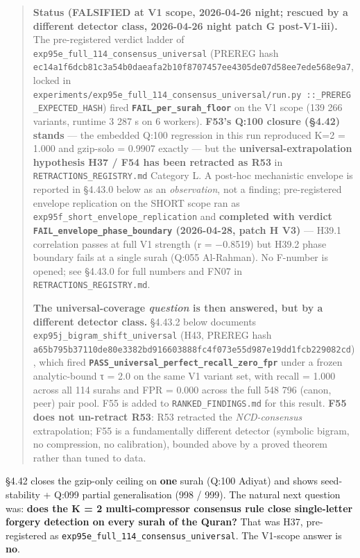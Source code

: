 \documentclass[
]{article}
\begin{document}
\begin{quote}
\textbf{Status (FALSIFIED at V1 scope, 2026-04-26 night; rescued by a
different detector class, 2026-04-26 night patch G post-V1-iii).} The
pre-registered verdict ladder of
\texttt{exp95e\_full\_114\_consensus\_universal} (PREREG hash
\texttt{ec14a1f6dcb81c3a54b0daeafa2b10f8707457ee4305de07d58ee7ede568e9a7},
locked in
\texttt{experiments/exp95e\_full\_114\_consensus\_universal/run.py\ ::\_PREREG\_EXPECTED\_HASH})
fired \textbf{\texttt{FAIL\_per\_surah\_floor}} on the V1 scope (139 266
variants, runtime 3 287 s on 6 workers). \textbf{F53's Q:100 closure
(§4.42) stands} --- the embedded Q:100 regression in this run reproduced
K=2 = 1.000 and gzip-solo = 0.9907 exactly --- but the
\textbf{universal-extrapolation hypothesis H37 / F54 has been retracted
as R53} in \texttt{RETRACTIONS\_REGISTRY.md} Category L. A post-hoc
mechanistic envelope is reported in §4.43.0 below as an
\emph{observation}, not a finding; pre-registered envelope replication
on the SHORT scope ran as \texttt{exp95f\_short\_envelope\_replication}
and \textbf{completed with verdict
\texttt{FAIL\_envelope\_phase\_boundary} (2026-04-28, patch H V3)} ---
H39.1 correlation passes at full V1 strength (r = −0.8519) but H39.2
phase boundary fails at a single surah (Q:055 Al-Rahman). No F-number is
opened; see §4.43.0 for full numbers and FN07 in
\texttt{RETRACTIONS\_REGISTRY.md}.

\textbf{The universal-coverage \emph{question} is then answered, but by
a different detector class.} §4.43.2 below documents
\texttt{exp95j\_bigram\_shift\_universal} (H43, PREREG hash
\texttt{a65b795b37110de80e3382bd916603888fc4f073e55d987e19dd1fcb229082cd}),
which fired
\textbf{\texttt{PASS\_universal\_perfect\_recall\_zero\_fpr}} under a
frozen analytic-bound τ = 2.0 on the same V1 variant set, with recall =
1.000 across all 114 surahs and FPR = 0.000 across the full 548 796
(canon, peer) pair pool. F55 is added to \texttt{RANKED\_FINDINGS.md}
for this result. \textbf{F55 does not un-retract R53}: R53 retracted the
\emph{NCD-consensus} extrapolation; F55 is a fundamentally different
detector (symbolic bigram, no compression, no calibration), bounded
above by a proved theorem rather than tuned to data.
\end{quote}

§4.42 closes the gzip-only ceiling on \textbf{one} surah (Q:100 Adiyat)
and shows seed-stability + Q:099 partial generalisation (998 / 999). The
natural next question was: \textbf{does the K = 2 multi-compressor
consensus rule close single-letter forgery detection on every surah of
the Quran?} That was H37, pre-registered as
\texttt{exp95e\_full\_114\_consensus\_universal}. The V1-scope answer is
\textbf{no}.
\end{document}
